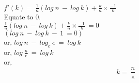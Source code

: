 \documentclass{llncs}
\begin{document}
 $f'(k)=\ \frac{1}{n} (log\ n\ -\ log\ k) + \frac{k}{n} \times \frac{-1}{k}$\\
 
 Equate to $0$. \\
 
 $\frac{1}{n} (log\ n\ -\ log\ k) + \frac{k}{n} \times \frac{-1}{k}\ =0$\\
 
 $ (log\ n\ -\ log\ k\ -\ 1\ = 0)$\\
 
 or, $log\ n\ -\ log_e\ e\ =\ log\ k$\\
 
 or, $log\ \frac{n}{e}\ =\ log\ k$\\
 
 or, 
\[
 \boxed{k=\ \frac{n}{e}}
 \]
\end{document}
